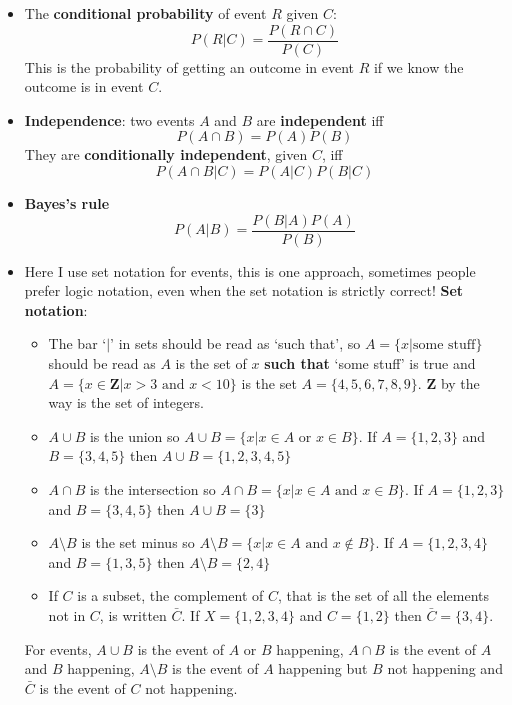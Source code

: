 \documentclass[11pt,a4paper]{scrartcl}
\begin{document}
\begin{itemize}


\item The \textbf{conditional probability} of event $R$ given $C$:
  \begin{equation}
P(R|C)=\frac{P(R\cap C)}{P(C)} 
  \end{equation}
  This is the probability of getting an outcome in event $R$ if we
  know the outcome is in event $C$.

\item \textbf{Independence}: two events $A$ and $B$ are \textbf{independent} iff
  \begin{equation}
    P(A\cap B)=P(A)P(B)
  \end{equation}
  They are \textbf{conditionally independent}, given $C$, iff
  \begin{equation}
    P(A\cap B|C)=P(A|C)P(B|C)
  \end{equation}

\item \textbf{Bayes's rule}
\begin{equation}
P(A|B)=\frac{P(B|A)P(A)}{P(B)}
\end{equation}


\item  Here I use set notation for events, this is one approach, sometimes people prefer logic notation, even when the set notation is strictly correct!
 \textbf{Set notation}:
  \begin{itemize}
\item The bar `$|$' in sets should be read as `such that', so $A=\{x|\mbox{some stuff}\}$ should be read as $A$ is the set of $x$ \textbf{such that} `some stuff' is true and $A=\{x\in \mathbf{Z}|x>3\mbox{ and }x<10\}$ is the set $A=\{4,5,6,7,8,9\}$. $\mathbf{Z}$ by the way is the set of integers.
  \item $A\cup B$ is the union so $A\cup B=\{x|x\in A\mbox{ or }x\in B\}$. If $A=\{1,2,3\}$ and $B=\{3,4,5\}$ then $A\cup B=\{1,2,3,4,5\}$
  \item $A\cap B$ is the intersection so $A\cap B=\{x|x\in A\mbox{ and }x\in B\}$. If $A=\{1,2,3\}$ and $B=\{3,4,5\}$ then $A\cup B=\{3\}$
   \item $A\setminus B$ is the set minus so $A\setminus B=\{x|x\in A\mbox{ and }x\not\in B\}$. If $A=\{1,2,3,4\}$ and $B=\{1,3,5\}$ then $A\setminus B=\{2,4\}$
   \item If $C$ is a subset, the complement of $C$, that is the set of all the elements not in $C$, is written $\bar{C}$. If $X=\{1,2,3,4\}$ and $C=\{1,2\}$ then $\bar{C}=\{3,4\}$.
  \end{itemize}
  For events, $A\cup B$ is the event of $A$ or $B$ happening, $A\cap
  B$ is the event of $A$ and $B$ happening, $A\setminus B$ is the
  event of $A$ happening but $B$ not happening and $\bar{C}$ is the
  event of $C$ not happening.

  \end{itemize}
\end{document}
